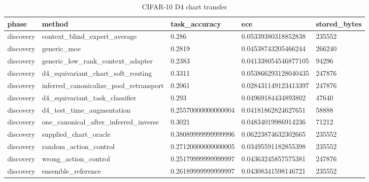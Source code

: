 \begin{table}[t]
\centering
\caption{CIFAR-10 D4 chart transfer}
\begin{tabular}{lllll}
\toprule
phase & method & task\_accuracy & ece & stored\_bytes \\
\midrule
discovery & context\_blind\_expert\_average & 0.286 & 0.05339380318852838 & 235552 \\
discovery & generic\_moe & 0.2819 & 0.04538743205466244 & 266240 \\
discovery & generic\_low\_rank\_context\_adapter & 0.2383 & 0.041338054546877105 & 94296 \\
discovery & d4\_equivariant\_chart\_soft\_routing & 0.3311 & 0.053866293128040435 & 247876 \\
discovery & inferred\_canonicalize\_pool\_retransport & 0.2061 & 0.028431149123413397 & 247876 \\
discovery & d4\_equivariant\_task\_classifier & 0.293 & 0.04969184434893802 & 47640 \\
discovery & d4\_test\_time\_augmentation & 0.25570000000000004 & 0.04181862824627651 & 58888 \\
discovery & one\_canonical\_after\_inferred\_inverse & 0.3021 & 0.04834019986914236 & 71212 \\
discovery & supplied\_chart\_oracle & 0.38089999999999996 & 0.06223874632302665 & 235552 \\
discovery & random\_action\_control & 0.27120000000000005 & 0.03495591182855398 & 235552 \\
discovery & wrong\_action\_control & 0.25179999999999997 & 0.04363245857575381 & 247876 \\
discovery & ensemble\_reference & 0.26189999999999997 & 0.04308341598146721 & 235552 \\
\bottomrule
\end{tabular}
\end{table}
